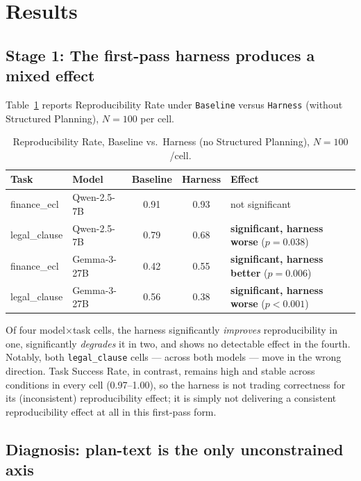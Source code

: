 \documentclass[11pt]{article}
\begin{document}
\section{Results}

\subsection{Stage 1: The first-pass harness produces a mixed effect}
\label{sec:stage1}

Table~\ref{tab:stage1} reports Reproducibility Rate under \texttt{Baseline} versus \texttt{Harness} (without Structured Planning), $N=100$ per cell.

\begin{table}[h]
\centering
\caption{Reproducibility Rate, Baseline vs.\ Harness (no Structured Planning), $N=100$/cell.}
\label{tab:stage1}
\begin{tabular}{@{}llccl@{}}
\toprule
Task & Model & Baseline & Harness & Effect \\
\midrule
finance\_ecl & Qwen-2.5-7B & 0.91 & 0.93 & not significant \\
legal\_clause & Qwen-2.5-7B & 0.79 & 0.68 & \textbf{significant, harness worse} ($p=0.038$) \\
finance\_ecl & Gemma-3-27B & 0.42 & 0.55 & \textbf{significant, harness better} ($p=0.006$) \\
legal\_clause & Gemma-3-27B & 0.56 & 0.38 & \textbf{significant, harness worse} ($p<0.001$) \\
\bottomrule
\end{tabular}
\end{table}

Of four model$\times$task cells, the harness significantly \emph{improves} reproducibility in one, significantly \emph{degrades} it in two, and shows no detectable effect in the fourth. Notably, both \texttt{legal\_clause} cells --- across both models --- move in the wrong direction. Task Success Rate, in contrast, remains high and stable across conditions in every cell (0.97--1.00), so the harness is not trading correctness for its (inconsistent) reproducibility effect; it is simply not delivering a consistent reproducibility effect at all in this first-pass form.

\subsection{Diagnosis: plan-text is the only unconstrained axis}
\label{sec:diagnosis}
\end{document}
